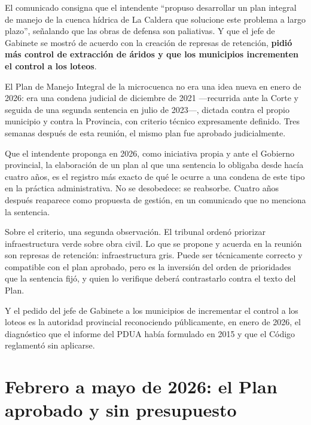 El comunicado consigna que el intendente ``propuso desarrollar un plan integral de manejo de la cuenca hídrica de La Caldera que solucione este problema a largo plazo'', señalando que las obras de defensa son paliativas. Y que el jefe de Gabinete se mostró de acuerdo con la creación de represas de retención, \textbf{pidió más control de extracción de áridos y que los municipios incrementen el control a los loteos}.

El Plan de Manejo Integral de la microcuenca no era una idea nueva en enero de 2026: era una condena judicial de diciembre de 2021 ---recurrida ante la Corte y seguida de una segunda sentencia en julio de 2023---, dictada contra el propio municipio y contra la Provincia, con criterio técnico expresamente definido. Tres semanas después de esta reunión, el mismo plan fue aprobado judicialmente.

Que el intendente proponga en 2026, como iniciativa propia y ante el Gobierno provincial, la elaboración de un plan al que una sentencia lo obligaba desde hacía cuatro años, es el registro más exacto de qué le ocurre a una condena de este tipo en la práctica administrativa. No se desobedece: se reabsorbe. Cuatro años después reaparece como propuesta de gestión, en un comunicado que no menciona la sentencia.

Sobre el criterio, una segunda observación. El tribunal ordenó priorizar infraestructura verde sobre obra civil. Lo que se propone y acuerda en la reunión son represas de retención: infraestructura gris. Puede ser técnicamente correcto y compatible con el plan aprobado, pero es la inversión del orden de prioridades que la sentencia fijó, y quien lo verifique deberá contrastarlo contra el texto del Plan.

Y el pedido del jefe de Gabinete a los municipios de incrementar el control a los loteos es la autoridad provincial reconociendo públicamente, en enero de 2026, el diagnóstico que el informe del PDUA había formulado en 2015 y que el Código reglamentó sin aplicarse.

\section{Febrero a mayo de 2026: el Plan aprobado y sin presupuesto}

